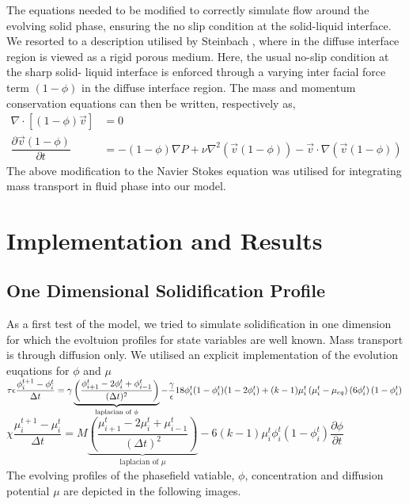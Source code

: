 \documentclass[a4paper]{report}
\begin{document}
The equations needed to be modified to correctly simulate flow around the evolving solid phase, ensuring the no slip condition
at the solid-liquid interface. We resorted to a description utilised by Steinbach \cite{Stein}, where in the diffuse interface 
region is viewed as a rigid porous medium. Here, the usual no-slip condition at the sharp solid- 
liquid interface is enforced through a varying inter facial force term $(1-\phi)$ in the diffuse interface 
region.
The mass and momentum conservation equations can then be written, respectively as,
\begin{align}
	\nabla\cdot[(1-\phi)\vec{v}] &= 0\\
	\dfrac{\partial \vec{v}(1-\phi)}{\partial t} &= -(1-\phi)\nabla P + \nu\nabla^2\left(\vec{v}(1-\phi)\right) - \vec{v}\cdot\nabla\left(\vec{v}(1-\phi)\right)
\end{align}
The above modification to the Navier Stokes equation was utilised for integrating mass transport in fluid phase into our model.

\chapter{Implementation and Results}

\section{One Dimensional Solidification Profile}

As a first test of the model, we tried to simulate solidification in one dimension for which the 
evoltuion profiles for state variables are well known. 
Mass transport is through diffusion only.
We utilised an explicit implementation of the evolution euqations for $\phi$ and $\mu$\\
$\tau\epsilon\dfrac{\phi_i^{t+1} - \phi_i^{t}}{\Delta t} = \gamma\underbrace{\left(\dfrac{\phi_{i+1}^t-2\phi_i^{t}+\phi_{i-1}^t}{(\Delta t)^2}\right)}_{\text{laplacian of }\phi} 
-\dfrac{\gamma}{\epsilon}18\phi_i^t(1-\phi_i^t)(1-2\phi_i^t)
					+(k - 1)\mu_i^t\left(\mu_i^t-\mu_{eq}\right)(6\phi_i^t)\left(1-\phi_i^t\right)\\
$
\\	
$
\chi \dfrac{\mu_i^{t+1} - \mu_i^{t}}{\Delta t} =  M\underbrace{\left(\dfrac{\mu_{i+1}^t-2\mu_i^{t}+\mu_{i-1}^t}{(\Delta t)^2}\right)}_{\text{laplacian of $\mu$}} 
	- 6\left(k-1\right)\mu_i^t\phi_i^t\left(1-\phi_i^t\right)\dfrac{\partial\phi}{\partial t}
$
\\
The evolving profiles of the phasefield vatiable, $\phi$, concentration and diffusion potential $\mu$ are depicted in the following images.
\end{document}
